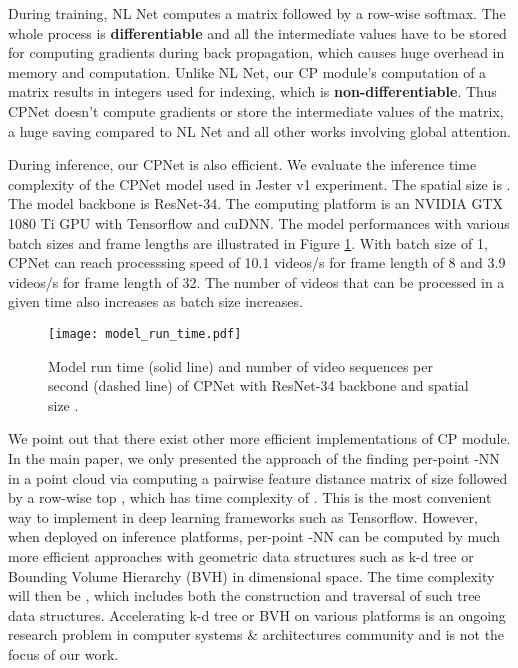 \documentclass[10pt,twocolumn,letterpaper]{article}
\begin{document}
During training, NL Net \cite{NLNet} computes a   matrix followed by a row-wise softmax. The whole process is \textbf{differentiable} and all the intermediate values have to be stored for computing gradients during back propagation, which causes huge overhead in memory and computation. Unlike NL Net, our CP module's computation of a  matrix results in  integers used for indexing, which is \textbf{non-differentiable}.  Thus CPNet doesn't compute gradients or store the intermediate values of the  matrix, a huge saving compared to NL Net and all  other works involving global attention.

During inference, our CPNet is also efficient. We evaluate the inference time complexity of the CPNet model used in Jester v1 experiment. The spatial size is . The model backbone is ResNet-34. The computing platform is an NVIDIA GTX 1080 Ti GPU with Tensorflow and cuDNN. The model performances with various batch sizes and frame lengths are illustrated in Figure \ref{fig:run:time}. With batch size of 1, CPNet can reach processsing speed of 10.1 videos/s for frame length of 8 and 3.9 videos/s for frame length of 32. The number of videos that can be processed in a given time also increases as batch size increases.   

\begin{figure}[t]
\centering
\texttt{[image: model\_run\_time.pdf]}
\caption{Model run time (solid line) and number of video sequences per second (dashed line) of CPNet with ResNet-34 backbone and spatial size .}
\label{fig:run:time}
\vspace{-2ex}
\end{figure}

We point out that there exist other more efficient implementations of CP module.  In the main paper, we only presented the approach of the finding per-point -NN in a point cloud via computing a pairwise feature distance matrix of size  followed by a row-wise  top , which has time complexity of . This is the most convenient way to implement in deep learning frameworks such as Tensorflow. 
However, when deployed on inference platforms, per-point -NN  can be computed by much more efficient approaches with geometric data structures such as k-d tree \cite{kd-tree} or Bounding Volume Hierarchy (BVH) \cite{BVH} in  dimensional space. The time complexity will then be , which includes both the construction and traversal of such tree data structures. Accelerating k-d tree or BVH on various platforms is an ongoing research problem in computer systems \& architectures community and is not the focus of our work. 
\end{document}
